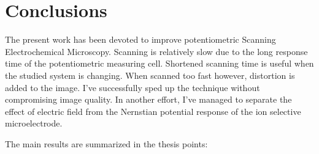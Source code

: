 \section{Conclusions}
The present work has been devoted to improve potentiometric Scanning Electrochemical Microscopy.
Scanning is relatively slow due to the long response time of the potentiometric measuring cell.
Shortened scanning time is useful when the studied system is changing.
When scanned too fast however, distortion is added to the image.
I've successfully sped up the technique without compromising image quality.
In another effort, I've managed to separate the effect of electric field from the Nernstian potential response of the ion selective microelectrode. 

The main results are summarized in the thesis points:


